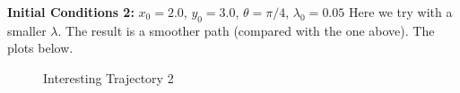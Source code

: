 \documentclass[10pt,a4paper]{article}
\begin{document}
\textbf{Initial Conditions 2:} $x_{0} = 2.0$, $y_{0} = 3.0$, $\theta = \pi / 4 $, $\lambda_{0} = 0.05$
Here we try with a smaller $\lambda$. The result is a smoother path (compared with the one above). The plots below. 

	\begin{figure}[h]
			\centering
            \caption{ Interesting Trajectory 2 }
            \label{fig:Q2b2}
	\end{figure}
\end{document}
